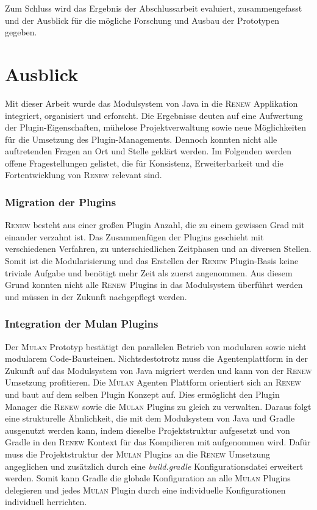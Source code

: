  Zum Schluss wird das Ergebnis der Abschlussarbeit evaluiert, zusammengefasst und der Ausblick für die mögliche Forschung und Ausbau der Prototypen gegeben. 


\section{Ausblick} 

	Mit dieser Arbeit wurde das Modulsystem von Java in die \textsc{Renew} Applikation integriert, organisiert und erforscht. Die Ergebnisse deuten auf eine Aufwertung der Plugin-Eigenschaften, mühelose Projektverwaltung sowie neue Möglichkeiten für die Umsetzung des Plugin-Managements. Dennoch konnten nicht alle auftretenden Fragen an Ort und Stelle geklärt werden.\bigbreak
	Im Folgenden werden offene Fragestellungen gelistet, die für Konsistenz, Erweiterbarkeit und die Fortentwicklung von \textsc{Renew} relevant sind. 
	
 \subsubsection{Migration der Plugins}
	\textsc{Renew} besteht aus einer großen Plugin Anzahl, die zu einem gewissen Grad mit einander verzahnt ist. Das  Zusammenfügen der Plugins geschieht mit verschiedenen Verfahren, zu unterschiedlichen Zeitphasen und an diversen Stellen. Somit ist die Modularisierung und das Erstellen der \textsc{Renew} Plugin-Basis keine triviale Aufgabe und benötigt mehr Zeit als zuerst angenommen. Aus diesem Grund konnten nicht alle \textsc{Renew} Plugins in das Modulsystem überführt werden und müssen in der Zukunft nachgepflegt werden. 

 \subsubsection{Integration der Mulan Plugins}
	Der \textsc{Mulan} Prototyp bestätigt den parallelen Betrieb von modularen sowie nicht modularem Code-Bausteinen. Nichtsdestotrotz muss die Agentenplattform in der Zukunft auf das Modulsystem von Java migriert werden und kann von der \textsc{Renew} Umsetzung profitieren.\newline 
	Die \textsc{Mulan} Agenten Plattform orientiert sich an \textsc{Renew} und baut auf dem selben Plugin Konzept auf. Dies ermöglicht den Plugin Manager die \textsc{Renew} sowie die \textsc{Mulan} Plugins zu gleich zu verwalten. Daraus folgt eine strukturelle Ähnlichkeit, die mit dem Modulsystem von Java und Gradle ausgenutzt werden kann, indem dieselbe Projektstruktur aufgesetzt und von Gradle in den \textsc{Renew} Kontext für das Kompilieren mit aufgenommen wird.\newline
	Dafür muss die Projektstruktur der \textsc{Mulan} Plugins an die \textsc{Renew} Umsetzung angeglichen und zusätzlich durch eine \textit{build.gradle} Konfigurationsdatei erweitert werden. Somit kann Gradle die globale Konfiguration an alle \textsc{Mulan} Plugins delegieren und jedes \textsc{Mulan} Plugin durch eine individuelle Konfigurationen individuell herrichten. 
		
